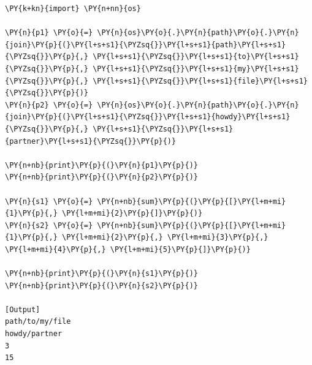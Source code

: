 \begin{Verbatim}[label=\makebox{\url{https://github.com/lucabaldini/cmepda/tree/master/slides/latex/snippets/func\_variadic1.py}},commandchars=\\\{\}]
\PY{k+kn}{import} \PY{n+nn}{os}

\PY{n}{p1} \PY{o}{=} \PY{n}{os}\PY{o}{.}\PY{n}{path}\PY{o}{.}\PY{n}{join}\PY{p}{(}\PY{l+s+s1}{\PYZsq{}}\PY{l+s+s1}{path}\PY{l+s+s1}{\PYZsq{}}\PY{p}{,} \PY{l+s+s1}{\PYZsq{}}\PY{l+s+s1}{to}\PY{l+s+s1}{\PYZsq{}}\PY{p}{,} \PY{l+s+s1}{\PYZsq{}}\PY{l+s+s1}{my}\PY{l+s+s1}{\PYZsq{}}\PY{p}{,} \PY{l+s+s1}{\PYZsq{}}\PY{l+s+s1}{file}\PY{l+s+s1}{\PYZsq{}}\PY{p}{)}
\PY{n}{p2} \PY{o}{=} \PY{n}{os}\PY{o}{.}\PY{n}{path}\PY{o}{.}\PY{n}{join}\PY{p}{(}\PY{l+s+s1}{\PYZsq{}}\PY{l+s+s1}{howdy}\PY{l+s+s1}{\PYZsq{}}\PY{p}{,} \PY{l+s+s1}{\PYZsq{}}\PY{l+s+s1}{partner}\PY{l+s+s1}{\PYZsq{}}\PY{p}{)}

\PY{n+nb}{print}\PY{p}{(}\PY{n}{p1}\PY{p}{)}
\PY{n+nb}{print}\PY{p}{(}\PY{n}{p2}\PY{p}{)}

\PY{n}{s1} \PY{o}{=} \PY{n+nb}{sum}\PY{p}{(}\PY{p}{[}\PY{l+m+mi}{1}\PY{p}{,} \PY{l+m+mi}{2}\PY{p}{]}\PY{p}{)}
\PY{n}{s2} \PY{o}{=} \PY{n+nb}{sum}\PY{p}{(}\PY{p}{[}\PY{l+m+mi}{1}\PY{p}{,} \PY{l+m+mi}{2}\PY{p}{,} \PY{l+m+mi}{3}\PY{p}{,} \PY{l+m+mi}{4}\PY{p}{,} \PY{l+m+mi}{5}\PY{p}{]}\PY{p}{)}

\PY{n+nb}{print}\PY{p}{(}\PY{n}{s1}\PY{p}{)}
\PY{n+nb}{print}\PY{p}{(}\PY{n}{s2}\PY{p}{)}

[Output]
path/to/my/file
howdy/partner
3
15
\end{Verbatim}
